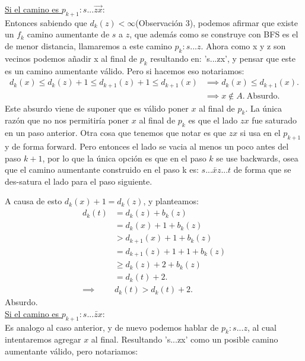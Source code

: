 \documentclass{article}
\begin{document}
\underline{Si el camino es $p_{k+1}:s...\overrightarrow{zx}$}:\\

Entonces sabiendo que $d_k(z) < \infty$(Observación 3),
podemos afirmar que existe un $f_k$ camino aumentante
de $s$ a $z$, que además como se construye con BFS es el de menor distancia,
llamaremos a este camino $p_k:s...z$. Ahora como x y z son vecinos podemos añadir x al
final de $p_k$ resultando en: 's...zx', y pensar que este es un camino aumentante válido.
Pero si hacemos eso notariamos:
\begin{equation}
	\begin{aligned}
		d_k(x) \leq d_k(z) + 1 \leq d_{k+1}(z) + 1 \leq d_{k+1}(x)
		&\implies d_k(x) \leq d_{k+1}(x).\\
		&\implies x \notin A.\ \text{Absurdo.}
	\end{aligned}
\end{equation}
Este absurdo viene de suponer que es válido poner $x$ al final de $p_k$. La única razón que no
nos permitiría poner $x$ al final de $p_k$ es que el lado $zx$ fue saturado en un paso anterior.
Otra cosa que tenemos que notar es que $zx$ si usa en el $p_{k+1}$ y de forma forward.
Pero entonces el lado se vacia al menos un poco antes del paso $k+1$, por lo que la única opción
es que en el paso $k$ se use backwards, osea que el camino aumentante construido en el paso k
es: $s...\overleftarrow{xz}...t$ de forma que se des-satura el lado para el paso siguiente.

A causa de esto $d_k(x) + 1 = d_k(z)$, y planteamos:
\begin{equation}
	\begin{aligned}
		d_k(t) &= d_k(z) + b_k(z)\\
		       &= d_k(x) + 1 + b_k(z)\\
		       &> d_{k+1}(x) + 1 + b_k(z)\\
		       &= d_{k+1}(z) + 1 + 1 + b_k(z)\\
		       &\geq d_k(z) + 2 + b_k(z)\\
		       &= d_k(t)  + 2.\\
		\implies& d_k(t) > d_k(t) + 2.
	\end{aligned}
\end{equation}
Absurdo.\\
\underline{Si el camino es $p_{k+1}:s...\overleftarrow{zx}$}:\\

Es analogo al caso anterior, y de nuevo podemos hablar de $p_k:s...z$, al cual intentaremos
agregar $x$ al final. Resultando 's...zx' como un posible camino aumentante válido, pero notariamos:
\end{document}
